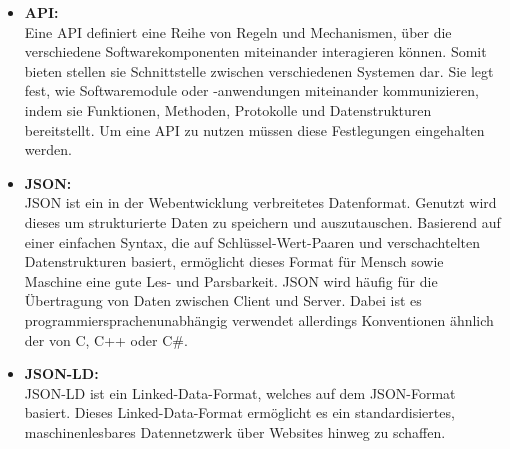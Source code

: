 \begin{itemize}
    \item \textbf{\acf{API}:} \\
    Eine \ac{API} definiert eine Reihe von Regeln und Mechanismen, über die verschiedene Softwarekomponenten miteinander interagieren können.
    Somit bieten stellen sie Schnittstelle zwischen verschiedenen Systemen dar.
    Sie legt fest, wie Softwaremodule oder -anwendungen miteinander kommunizieren, indem sie Funktionen, Methoden, Protokolle und Datenstrukturen bereitstellt.
    Um eine \ac{API} zu nutzen müssen diese Festlegungen eingehalten werden.
    
    
    \item \textbf{\acf{JSON}}\textsuperscript{\cite{link:JSON}}\textbf{:} \\
    \ac{JSON} ist ein in der Webentwicklung verbreitetes Datenformat.
    Genutzt wird dieses um strukturierte Daten zu speichern und auszutauschen.
    Basierend auf einer einfachen Syntax, die auf Schlüssel-Wert-Paaren und verschachtelten Datenstrukturen basiert, ermöglicht dieses Format für Mensch sowie Maschine eine gute Les- und Parsbarkeit.
    \ac{JSON} wird häufig für die Übertragung von Daten zwischen Client und Server.
    Dabei ist es programmiersprachenunabhängig verwendet allerdings Konventionen ähnlich der von C, C++ oder C\#.

    \item \textbf{\acf{JSON-LD}}\textsuperscript{\cite{link:JSON-LD}}\textbf{:} \\
    \ac{JSON-LD} ist ein Linked-Data-Format, welches auf dem \ac{JSON}-Format basiert.
    Dieses Linked-Data-Format\textsuperscript{\cite{link:LinkedData}} ermöglicht es ein standardisiertes, maschinenlesbares Datennetzwerk über Websites hinweg zu schaffen.
\end{itemize}